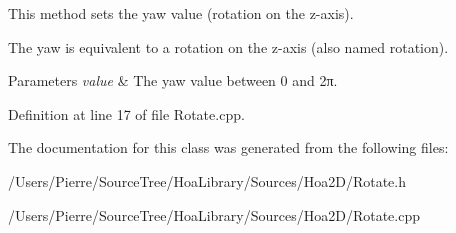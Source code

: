 This method sets the yaw value (rotation on the z-\/axis). 

The yaw is equivalent to a rotation on the z-\/axis (also named rotation).


\begin{DoxyParams}{Parameters}
{\em value} & The yaw value between 0 and 2π. \\
\hline
\end{DoxyParams}


Definition at line 17 of file Rotate.\-cpp.



The documentation for this class was generated from the following files\-:\begin{DoxyCompactItemize}
\item 
/\-Users/\-Pierre/\-Source\-Tree/\-Hoa\-Library/\-Sources/\-Hoa2\-D/Rotate.\-h\item 
/\-Users/\-Pierre/\-Source\-Tree/\-Hoa\-Library/\-Sources/\-Hoa2\-D/Rotate.\-cpp\end{DoxyCompactItemize}
